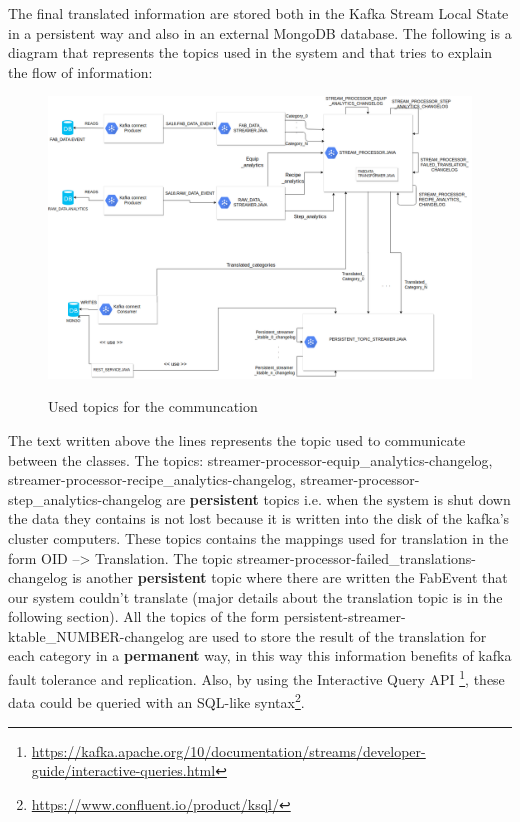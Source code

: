 The final translated information are stored both in the Kafka Stream Local State in a persistent way and also in an external MongoDB database.
The following is a diagram that represents the topics used in the system and that tries to explain the flow of information:

\begin{figure}[H]
\centering
\includegraphics[width=\textwidth]{img/diagram_topics.png} \\
\caption{Used topics for the communcation}
\end{figure}


The text written above the lines represents the topic used to communicate between the classes. The topics: streamer-processor-equip\_analytics-changelog, streamer-processor-recipe\_analytics-changelog, streamer-processor-step\_analytics-changelog are \textbf{persistent} topics i.e. when the system is shut down the data they contains is not lost because it is written into the disk of the kafka's cluster computers. These topics contains the mappings used for translation in the form OID --> Translation. The topic streamer-processor-failed\_translations-changelog is another \textbf{persistent} topic where there are written the FabEvent that our system couldn't translate (major details about the translation topic is in the following section).
All the topics of the form persistent-streamer-ktable\_NUMBER-changelog are used to store the result of the translation for each category in a \textbf{permanent} way, in this way this information benefits of kafka fault tolerance and replication. Also, by using the Interactive Query API \footnote{\url{https://kafka.apache.org/10/documentation/streams/developer-guide/interactive-queries.html}}, these data could be queried with an SQL-like syntax\footnote{\url{https://www.confluent.io/product/ksql/}}.

